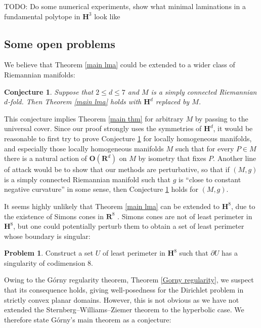 \documentclass[reqno,12pt,letterpaper]{amsart}
\newcommand{\RR}{\mathbf{R}}
\newcommand{\Hyp}{\mathbf H}
\newcommand{\Orth}{\mathbf{O}}
\newtheorem{conjecture}[theorem]{Conjecture}
\theoremstyle{definition}
\newtheorem{problem}[theorem]{Problem}
\numberwithin{equation}{section}
\begin{document}
TODO: Do some numerical experiments, show what minimal laminations in a fundamental polytope in $\Hyp^3$ look like



\subsection{Some open problems}
We believe that Theorem \ref{main lma} could be extended to a wider class of Riemannian manifolds:

\begin{conjecture}\label{main conj}
Suppose that $2 \leq d \leq 7$ and $M$ is a simply connected Riemannian $d$-fold. Then Theorem \ref{main lma} holds with $\Hyp^d$ replaced by $M$.
\end{conjecture}

This conjecture implies Theorem \ref{main thm} for arbitrary $M$ by passing to the universal cover.
Since our proof strongly uses the symmetries of $\Hyp^d$, it would be reasonable to first try to prove Conjecture \ref{main conj} for locally homogeneous manifolds, and especially those locally homogeneous manifolds $M$ such that for every $P \in M$ there is a natural action of $\Orth(\RR^d)$ on $M$ by isometry that fixes $P$.
Another line of attack would be to show that our methods are perturbative, so that if $(M, g)$ is a simply connected Riemannian manifold such that $g$ is ``close to constant negative curvature'' in some sense, then Conjecture \ref{main conj} holds for $(M, g)$.

It seems highly unlikely that Theorem \ref{main lma} can be extended to $\Hyp^8$, due to the existence of Simons cones in $\RR^8$ \cite[Theorem A]{BOMBIERI1969}.
Simons cones are not of least perimeter in $\Hyp^8$, but one could potentially perturb them to obtain a set of least perimeter whose boundary is singular:

\begin{problem}
    Construct a set $U$ of least perimeter in $\Hyp^8$ such that $\partial U$ has a singularity of codimension $8$.
\end{problem}

Owing to the G\'orny regularity theorem, Theorem \ref{Gorny regularity}, we suspect that its consequence \cite[Theorem 1.1]{górny2017planar} holds, giving well-posedness for the Dirichlet problem in strictly convex planar domains.
However, this is not obvious as we have not extended the Sternberg--Williams--Ziemer theorem \cite{ZiemerWilliamsSternberg1992} to the hyperbolic case.
We therefore state G\'orny's main theorem as a conjecture:
\end{document}
